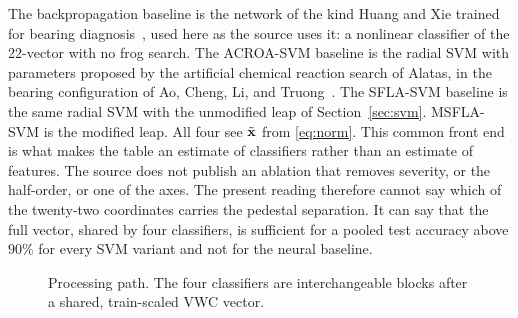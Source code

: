 The backpropagation baseline is the network of the kind Huang and Xie trained for bearing diagnosis~\cite{huang2009}, used here as the source uses it: a nonlinear classifier of the \(22\)-vector with no frog search.
The ACROA-SVM baseline is the radial SVM with parameters proposed by the artificial chemical reaction search of Alatas, in the bearing configuration of Ao, Cheng, Li, and Truong~\cite{ao2014,alatas2011}.
The SFLA-SVM baseline is the same radial SVM with the unmodified leap of Section~\ref{sec:svm}.
MSFLA-SVM is the modified leap.
All four see \(\tilde{\mathbf{x}}\) from \eqref{eq:norm}.
This common front end is what makes the table an estimate of classifiers rather than an estimate of features.
The source does not publish an ablation that removes severity, or the half-order, or one of the axes.
The present reading therefore cannot say which of the twenty-two coordinates carries the pedestal separation.
It can say that the full vector, shared by four classifiers, is sufficient for a pooled test accuracy above \(90\%\) for every SVM variant and not for the neural baseline.

\begin{figure}[H]
\centering
{}
\caption{Processing path. The four classifiers are interchangeable blocks after a shared, train-scaled VWC vector.}
\label{fig:path}
\end{figure}

